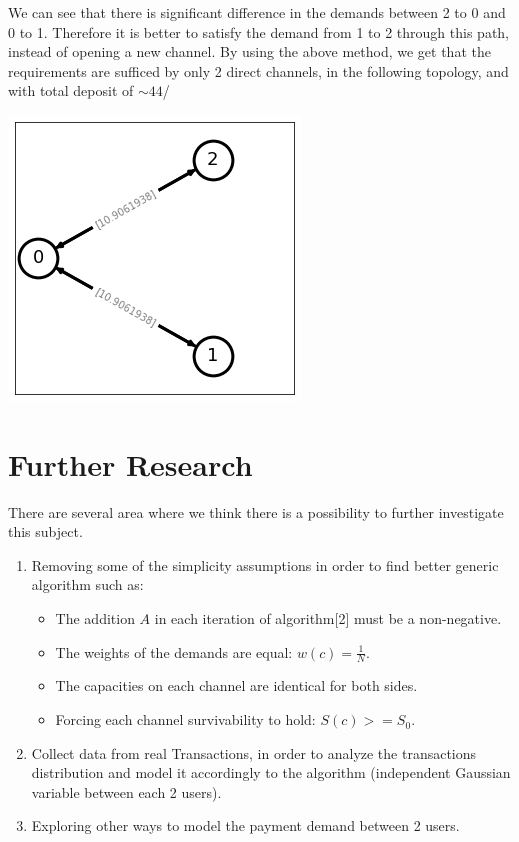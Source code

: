 \documentclass{cup-ino}
\begin{document}
We can see that there is significant difference in the demands between 2 to 0 and 0 to 1. Therefore it is better to satisfy the demand from 1 to 2 through this path, instead of opening a new channel.
By using the above method, we get that the requirements are sufficed by only 2 direct channels, in the following topology, and with total deposit of $\sim 44$/\\
\begin{center}
\includegraphics[scale=0.5]{img1.png}
\end{center}



\section{Further Research}
There are several area where we think there is a possibility to further investigate this subject.
\begin{enumerate}
    \item Removing some of the simplicity assumptions in order to find better generic algorithm such as:
    \begin{itemize}
        \item The addition $A$ in each iteration of algorithm[2] must be a non-negative.
        \item The weights of the demands are equal: $w(c) = \frac{1}{N}$.
        \item The capacities on each channel are identical for both sides.
        \item Forcing each channel survivability to hold: $S(c)>=S_0$.
    \end{itemize}
    \item Collect data from real Transactions, in order to analyze the transactions distribution and model it accordingly to the algorithm (independent Gaussian variable between each 2 users). 
    \item Exploring other ways to model the payment demand between 2 users.
\end{enumerate}
\end{document}
